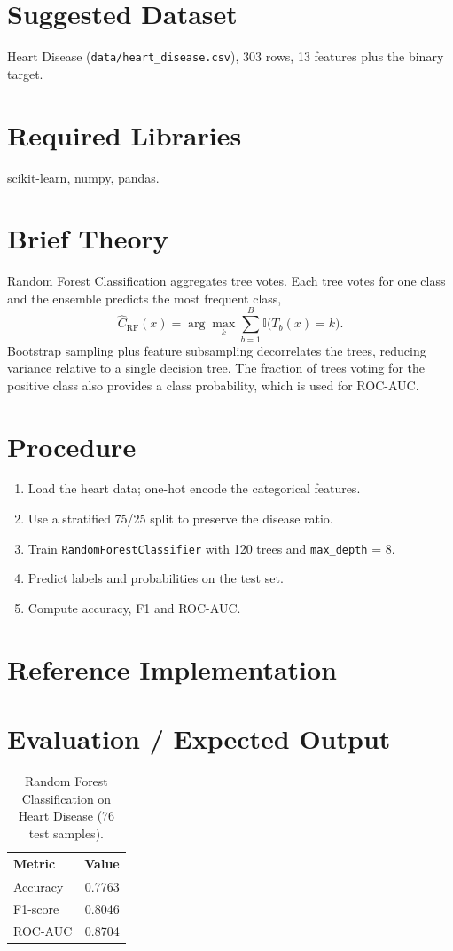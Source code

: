 \section{Suggested Dataset}
Heart Disease (\texttt{data/heart\_disease.csv}), 303 rows, 13 features plus the binary target.

\section{Required Libraries}
scikit-learn, numpy, pandas.

\section{Brief Theory}
Random Forest Classification aggregates tree votes. Each tree votes for one class and the
ensemble predicts the most frequent class,
\[
\hat{C}_{\mathrm{RF}}(x) = \arg\max_k \sum_{b=1}^{B} \mathbb{I}\bigl(T_b(x) = k\bigr) .
\]
Bootstrap sampling plus feature subsampling decorrelates the trees, reducing variance relative
to a single decision tree. The fraction of trees voting for the positive class also provides a
class probability, which is used for ROC-AUC.

\section{Procedure}
\begin{enumerate}
  \item Load the heart data; one-hot encode the categorical features.
  \item Use a stratified 75/25 split to preserve the disease ratio.
  \item Train \texttt{RandomForestClassifier} with 120 trees and \texttt{max\_depth} = 8.
  \item Predict labels and probabilities on the test set.
  \item Compute accuracy, F1 and ROC-AUC.
\end{enumerate}

\section{Reference Implementation}


\section{Evaluation / Expected Output}
\begin{table}[htbp]
  \centering
  \caption{Random Forest Classification on Heart Disease (76 test samples).}
  \begin{tabular}{|l|r|}
    \hline
\rowcolor{mlblue!8}    \textbf{Metric} & \textbf{Value} \\
    \hline
    Accuracy & 0.7763 \\
\hline
    F1-score & 0.8046 \\
\hline
    ROC-AUC & 0.8704 \\
    \hline
  \end{tabular}
\end{table}

